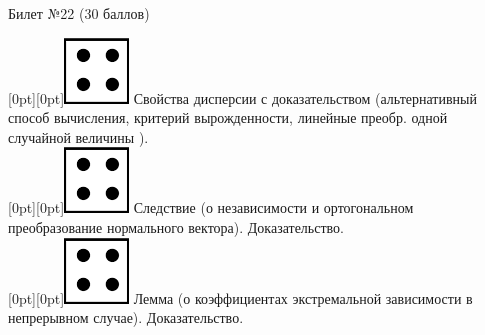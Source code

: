 \documentclass[10pt]{article}
\begin{document}
\thispagestyle{empty}

\topskip=0pt

\vspace*{\fill}

\begin{center} {\Large Билет №22 (30 баллов)} \end{center}

\raisebox{-1pt}[0pt][0pt]{\includegraphics[width=0.02\linewidth]{4.png}} Свойства дисперсии с доказательством (альтернативный способ вычисления, критерий вырожденности, линейные преобр. одной случайной величины ). \\ 

\raisebox{-1pt}[0pt][0pt]{\includegraphics[width=0.02\linewidth]{4.png}} Следствие (о независимости и  ортогональном преобразование нормального вектора). Доказательство. \\ 

\raisebox{-1pt}[0pt][0pt]{\includegraphics[width=0.02\linewidth]{4.png}} Лемма (о коэффициентах экстремальной зависимости в непрерывном случае). Доказательство. \\









\vspace*{\fill}
\end{document}
